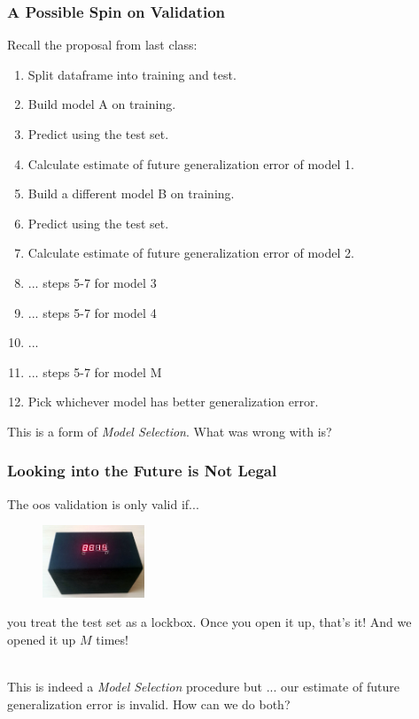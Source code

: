 \documentclass[handout]{beamer}
\begin{document}
\begin{frame}\frametitle{A Possible Spin on Validation}
\small

Recall the proposal from last class:
	
\begin{enumerate}\footnotesize
\item Split dataframe into training and test.
\item Build model A on training.
\item Predict using the test set. 
\item Calculate estimate of future generalization error of model 1.
\item Build a different model B on training.
\item Predict using the test set. 
\item Calculate estimate of future generalization error of model 2.
\item ... steps 5-7 for model 3
\item ... steps 5-7 for model 4
\item ...
\item ... steps 5-7 for model M
\item Pick whichever model has better generalization error.
\end{enumerate}

This is a form of \emph{Model Selection}. What was wrong with is?

\end{frame}

\begin{frame}\frametitle{Looking into the Future is Not Legal}

The oos validation is only valid if...

\begin{figure}
\centering
\includegraphics[width=1.2in]{lockbox.png}
\end{figure}

you treat the test set as a lockbox. Once you open it up, that's it! And we opened it up $M$ times!\\~\\ \pause

This is indeed a \emph{Model Selection} procedure but ... \pause our estimate of future generalization error is invalid. How can we do both?
	
\end{frame}
\end{document}
